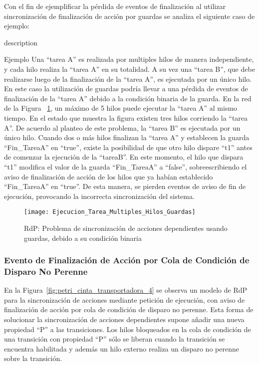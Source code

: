 Con el fin de ejemplificar la pérdida de eventos de finalización al utilizar
sincronización de finalización de acción por guardas se analiza el siguiente
caso de ejemplo:
\begin{labeling}{description}
\item [Ejemplo]
	Una ``tarea A'' es realizada por multiples hilos de manera independiente, y cada
	hilo realiza la ``tarea A'' en su totalidad. A su vez una ``tarea B'', que
	debe realizarse luego de la finalización de la ``tarea A'', es ejecutada por
	un único hilo. En este caso la utilización de guardas podría llevar a una
	pérdida de eventos de finalización de la ``tarea A'' debido a la condición
	binaria de la guarda. En la red de la Figura
	~\ref{fig:ejecucion_multiples_hilos_guardas}, un máximo de 5 hilos puede
	ejecutar la ``tarea A'' al mismo tiempo. En el estado que muestra la
	figura existen tres hilos corriendo la ``tarea A''. De acuerdo al planteo de
	este problema, la ``tarea B'' es ejecutada por un único hilo. Cuando dos o más
	hilos finalizan la ``tarea A'' y establecen la guarda ``Fin\_TareaA'' en ``true'',
	existe la posibilidad de que otro hilo dispare ``t1'' antes de comenzar la
	ejecución de la ``tareaB''. En este momento, el hilo que dispara ``t1''
	modifica el valor de la guarda ``Fin\_TareaA'' a ``false'', sobreescribiendo
	el aviso de finalización de acción de los hilos que ya habían establecido
	``Fin\_TareaA'' en ``true''. De esta manera, se pierden eventos de aviso de fin
	de ejecución, provocando la incorrecta sincronización del sistema.
\end{labeling}

\begin{figure}[H]
    \centering
    \texttt{[image: Ejecucion\_Tarea\_Multiples\_Hilos\_Guardas]}
    \caption{RdP: Problema de sincronización de acciones dependientes usando
    guardas, debido a su condición binaria}
    \label{fig:ejecucion_multiples_hilos_guardas}
\end{figure}


\subsubsection{Evento de Finalización de Acción por Cola de Condición de
Disparo No Perenne}
En la Figura~\ref{fig:petri_cinta_transportadora_4} se observa un modelo de
RdP para la sincronización de acciones mediante petición de ejecución, con aviso
de finalización de acción por cola de condición de disparo no perenne. 
Esta forma de solucionar la sincronización de acciones dependientes
supone añadir una nueva propiedad ``P'' a las transiciones. Los hilos
bloqueados en la cola de condición de una transición con propiedad ``P'' sólo
se liberan cuando la transición se encuentra habilitada y además un hilo
externo realiza un disparo no perenne sobre la transición.

